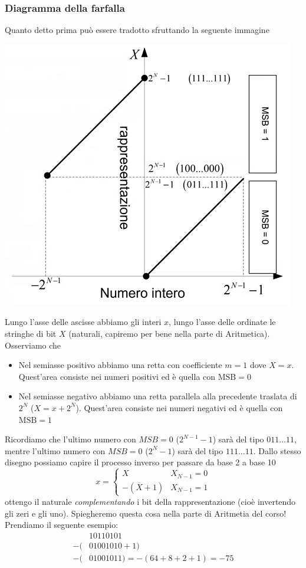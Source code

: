 \documentclass[11pt]{report}
\begin{document}
\subsubsection{Diagramma della farfalla}
Quanto detto prima può essere tradotto sfruttando la seguente immagine
\begin{center}
\includegraphics{img/2.PNG}
\end{center}
Lungo l'asse delle ascisse abbiamo gli interi $x$, lungo l'asse delle ordinate le stringhe di bit $X$ (naturali, capiremo per bene nella parte di Aritmetica).
Osserviamo che
\begin{itemize}
\item Nel semiasse positivo abbiamo una retta con coefficiente $m=1$ dove $X=x$. Quest'area consiste nei numeri positivi ed è quella con $\text{MSB}=0$
\item Nel semiasse negativo abbiamo una retta parallela alla precedente traslata di $2^N$ ($X=x+2^N$). Quest'area consiste nei numeri negativi ed è quella con $\text{MSB}=1$
\end{itemize}
Ricordiamo che l'ultimo numero con $MSB=0$ ($2^{N-1}-1$) sarà del tipo $011\dots 11$, mentre l'ultimo numero con $MSB=0$ ($2^N-1$) sarà del tipo $111\dots 11$. Dallo stesso disegno possiamo capire il processo inverso per passare da base 2 a base 10
\[x=\begin{cases}X&X_{N-1} = 0\\-(\overline{X}+1)&X_{N-1} = 1\end{cases}\]
ottengo il naturale \emph{complementando} i bit della rappresentazione (cioè invertendo gli zeri e gli uno). Spiegheremo questa cosa nella parte di Aritmetia del corso! Prendiamo il seguente esempio:
\begin{align*}&10110101\\-(&01001010+1)\\-(&01001011)=-(64+8+2+1)=-75\end{align*}
\end{document}
